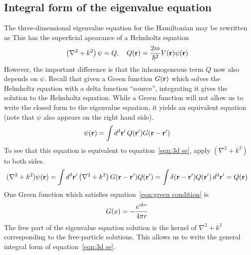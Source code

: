 \subsection{Integral form of the eigenvalue equation}
The three-dimensional eigenvalue equation for the Hamiltonian may be rewritten as 
This has the superficial apearance of a Helmholtz equation
\[ 
    \left(\nabla^2 + k^2\right)\psi = Q, \quad Q(\mathbf r) = \dfrac{2m}{\hbar^2}V(\mathbf r)\psi(\mathbf r)
\] 
However, the important difference is that the inhomogeneous term $Q$ 
now also depends on $\psi$. Recall that given a 
Green function $G(\mathbf r)$ which solves the Helmholtz equation with a 
delta function ``source'', integrating it gives the solution 
to the Helmholtz equation. 
While a Green function will not allow us to write the closed form 
to the eigenvalue equation, it yields an equivalent equation 
(note that $\psi$ also appears on the right hand side). 
\[ 
    \psi(\mathbf r) = \int d^3\mathbf r' \, 
    Q(\mathbf r') G(\mathbf r - \mathbf r')
\] 
To see that this equation is equivalent to equation~\ref{eqn:3d se}, 
apply $(\nabla^2+k^2)$ to both sides. 
\[ 
    (\nabla^2 + k^2)\psi(\mathbf r) = 
    \int d^3\mathbf r'\left(\nabla^2 + k^2\right)G(\mathbf{r - r'}) Q(\mathbf r') 
    = \int \delta(\mathbf{r-r'})Q(\mathbf r')\, d^3\mathbf r' = Q(\mathbf r)
\] 
One Green function which satisfies equation~\ref{eqn:green condition} is 
\[ 
    G(x) = -\dfrac{e^{ikr}}{4\pi r}
\] 
The free part of the eigenvalue equation solution is the kernel 
of $\nabla^2+k^2$ corresponding to the free-particle solutions. 
This allows us to write the general integral form of equation~\ref{eqn:3d se}. 
\begin{mdframed}
\end{mdframed}


